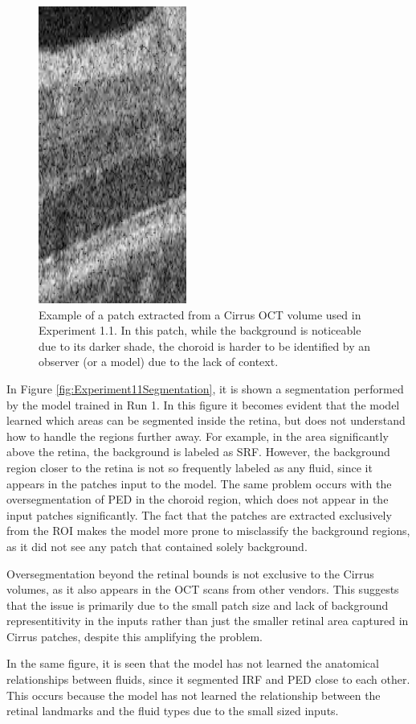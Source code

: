 \begin{figure}[!ht]
	\centering
	\includegraphics[width=0.18\linewidth]{figures/CirrusPatchExample.png}
	\caption{Example of a patch extracted from a Cirrus OCT volume used in Experiment 1.1. In this patch, while the background is noticeable due to its darker shade, the choroid is harder to be identified by an observer (or a model) due to the lack of context.}
	\label{fig:CirrusPatchExample}
\end{figure}

In Figure \ref{fig:Experiment11Segmentation}, it is shown a segmentation performed by the model trained in Run 1. In this figure it becomes evident that the model learned which areas can be segmented inside the retina, but does not understand how to handle the regions further away. For example, in the area significantly above the retina, the background is labeled as SRF. However, the background region closer to the retina is not so frequently labeled as any fluid, since it appears in the patches input to the model. The same problem occurs with the oversegmentation of PED in the choroid region, which does not appear in the input patches significantly. The fact that the patches are extracted exclusively from the ROI makes the model more prone to misclassify the background regions, as it did not see any patch that contained solely background.
\par
Oversegmentation beyond the retinal bounds is not exclusive to the Cirrus volumes, as it also appears in the OCT scans from other vendors. This suggests that the issue is primarily due to the small patch size and lack of background representitivity in the inputs rather than just the smaller retinal area captured in Cirrus patches, despite this amplifying the problem. 
\par
In the same figure, it is seen that the model has not learned the anatomical relationships between fluids, since it segmented IRF and PED close to each other. This occurs because the model has not learned the relationship between the retinal landmarks and the fluid types due to the small sized inputs.

